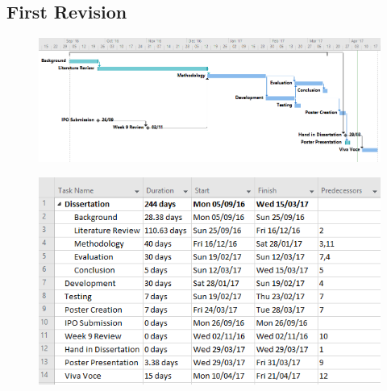 	\subsection{First Revision}
		\begin{figure}[h!]
			\includegraphics[width=\textwidth]{../images/gantt/v1/gantt.PNG}
		\end{figure}
		\begin{figure}[h!]
			\includegraphics[]{../images/gantt/v1/tasks.PNG}
		\end{figure}
	\clearpage
